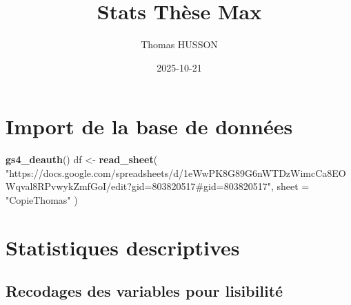 \documentclass[
]{article}
\title{Stats Thèse Max}
\author{Thomas HUSSON}
\date{2025-10-21}
\newenvironment{Shaded}{\begin{snugshade}}{\end{snugshade}}
\newcommand{\AttributeTok}[1]{\textcolor[rgb]{0.13,0.29,0.53}{#1}}
\newcommand{\FunctionTok}[1]{\textcolor[rgb]{0.13,0.29,0.53}{\textbf{#1}}}
\newcommand{\NormalTok}[1]{#1}
\newcommand{\OtherTok}[1]{\textcolor[rgb]{0.56,0.35,0.01}{#1}}
\newcommand{\StringTok}[1]{\textcolor[rgb]{0.31,0.60,0.02}{#1}}
\let\oldtableofcontents\tableofcontents
\renewcommand{\tableofcontents}{
    \begingroup
      \footnotesize                %
      \setlength{\parskip}{2pt}    %
      \oldtableofcontents
    \endgroup
  }
\begin{document}
\maketitle

{
\setcounter{tocdepth}{5}
\tableofcontents
}
\section{Import de la base de
données}\label{import-de-la-base-de-donnuxe9es}

\begin{Shaded}
\begin{Highlighting}[]
\FunctionTok{gs4\_deauth}\NormalTok{()}
\NormalTok{df }\OtherTok{\textless{}{-}} \FunctionTok{read\_sheet}\NormalTok{(}
  \StringTok{"https://docs.google.com/spreadsheets/d/1eWwPK8G89G6nWTDzWimcCa8EOWqval8RPvwykZmfGoI/edit?gid=803820517\#gid=803820517"}\NormalTok{,}
  \AttributeTok{sheet =} \StringTok{"CopieThomas"}
\NormalTok{)}
\end{Highlighting}
\end{Shaded}

\section{Statistiques descriptives}\label{statistiques-descriptives}

\subsection{Recodages des variables pour
lisibilité}\label{recodages-des-variables-pour-lisibilituxe9}
\end{document}
